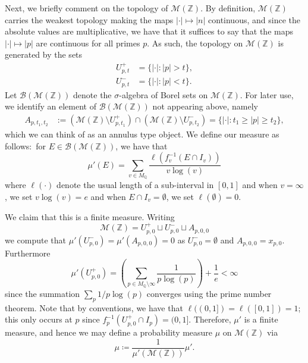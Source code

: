 \documentclass[11pt,reqno]{amsart}
\newcommand{\mZ}{\mathbb{Z}}
\newcommand{\mQ}{\mathbb{Q}}
\newcommand{\cB}{\mathcal{B}}
\newcommand{\pwr}[1]{ \left( #1 \right) }
\newcommand{\sM}{{\mathscr M}}
\theoremstyle{theorem}
\numberwithin{equation}{subsection}
\numberwithin{equation}{subsection}
\theoremstyle{definition}
\theoremstyle{remark}
\numberwithin{equation}{subsubsection} \numberwithin{figure}{section}
\renewcommand{\geq}{\geqslant}
\begin{document}
Next, we briefly comment on the topology of $\sM(\mZ)$. 
By definition, $\sM(\mZ)$ carries the weakest topology making the maps $|\cdot| \mapsto |n|$ continuous, and since the absolute values are multiplicative, we have that it suffices to say that the maps $|\cdot|\mapsto |p|$ are continuous for all primes $p$. 
As such, the topology on $\sM(\mZ)$ is generated by the sets
\begin{align*}
U_{p,t}^+ &= \{ |\cdot| : |p| > t\},\\
U_{p,t}^- &= \{ |\cdot| : |p| < t\}. 
\end{align*}
Let $\cB(\sM(\mZ))$ denote the $\sigma$-algebra of Borel sets on $\sM(\mZ)$. 
For later use, we identify an element of $\cB(\sM(\mZ))$ not appearing above, namely
\begin{align*}
A_{p,t_1,t_2} &:= (\sM(\mZ)\setminus U_{p,t_1}^+) \cap (\sM(\mZ)\setminus U_{p,t_2}^-) = \{|\cdot| : t_1 \geq |p| \geq t_2\},
\end{align*}
which we can think of as an annulus type object.  We define our measure as follows:~for $E\in \cB(\sM(\mZ))$, we have that 
\begin{equation}\label{eqn:measuremuprime}
\mu'(E) = \sum_{v\in M_{\mQ}} \frac{\ell(f_{v}^{-1}(E \cap I_v))}{v \log(v)}
\end{equation}
where $\ell(\cdot)$ denote the usual length of a sub-interval in $[0,1]$ and when $v = \infty$, we set $v \log(v) = e$ and when $E \cap I_v = \emptyset$, we set $\ell(\emptyset) = 0$. 

We claim that this is a finite measure. 
Writing 
\[
\sM(\mZ) = U_{p,0}^+ \sqcup U_{p,0}^- \sqcup A_{p,0,0}
\]
we compute that $\mu'(U_{p,0}^-) = \mu'(A_{p,0,0}) = 0$ as $U_{p,0}^- = \emptyset$ and $A_{p,0,0} = x_{p,0}$.
Furthermore
\[
\mu'(U_{p,0}^+) = \pwr{\sum_{p \in M_{\mQ}\setminus \infty} \frac{1}{p\log(p)}} + \frac{1}{e} < \infty
\]
since the summation $\sum_{p}1/p\log(p)$ converges using the prime number theorem. 
Note that by conventions, we have that $\ell((0,1]) = \ell([0,1]) = 1$; this only occurs at $p$ since $f_{p}^{-1}(U_{p,0}^+ \cap I_p) = (0,1]$. 
Therefore, $\mu'$ is a finite measure, and hence we may define a probability measure $\mu$ on $ \sM(\mZ)$ via 
\begin{equation}\label{eqn:measuremu}
\mu \coloneqq \frac{1}{\mu'(\sM(\mZ))}\mu'.
\end{equation}
\end{document}
